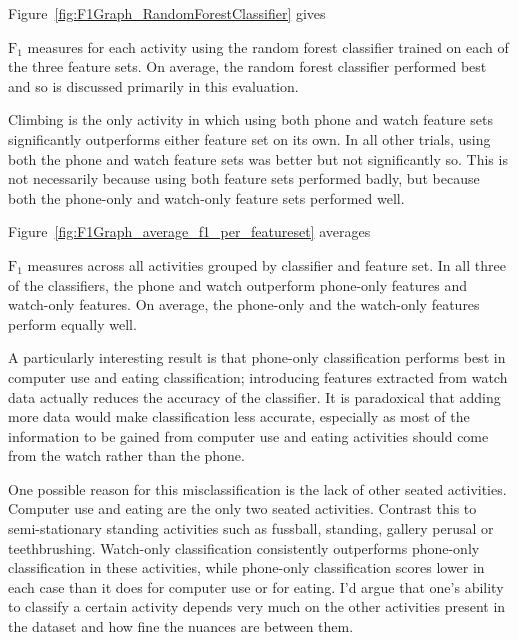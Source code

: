     Figure~\ref{fig:F1Graph_RandomForestClassifier} gives {$\mathrm{F}_1$ measures for each activity using the random forest classifier trained on each of the three feature sets. On average, the random forest classifier performed best and so is discussed primarily in this evaluation.
    
    Climbing is the only activity in which using both phone and watch feature sets significantly outperforms either feature set on its own. In all other trials, using both the phone and watch feature sets was better but not significantly so. This is not necessarily because using both feature sets performed badly, but because both the phone-only and watch-only feature sets performed well. 
  
    Figure~\ref{fig:F1Graph_average_f1_per_featureset} averages {$\mathrm{F}_1$ measures across all activities grouped by classifier and feature set. In all three of the classifiers, the phone and watch outperform phone-only features and watch-only features. On average, the phone-only and the watch-only features perform equally well.
    
    A particularly interesting result is that phone-only classification performs best in computer use and eating classification; introducing features extracted from watch data actually reduces the accuracy of the classifier. It is paradoxical that adding more data would make classification less accurate, especially as most of the information to be gained from computer use and eating activities should come from the watch rather than the phone.
    
    One possible reason for this misclassification is the lack of other seated activities. Computer use and eating are the only two seated activities. Contrast this to semi-stationary standing activities such as fussball, standing, gallery perusal or teethbrushing. Watch-only classification consistently outperforms phone-only classification in these activities, while phone-only classification scores lower in each case than it does for computer use or for eating. I'd argue that one's ability to classify a certain activity depends very much on the other activities present in the dataset and how fine the nuances are between them. 
    
}}
